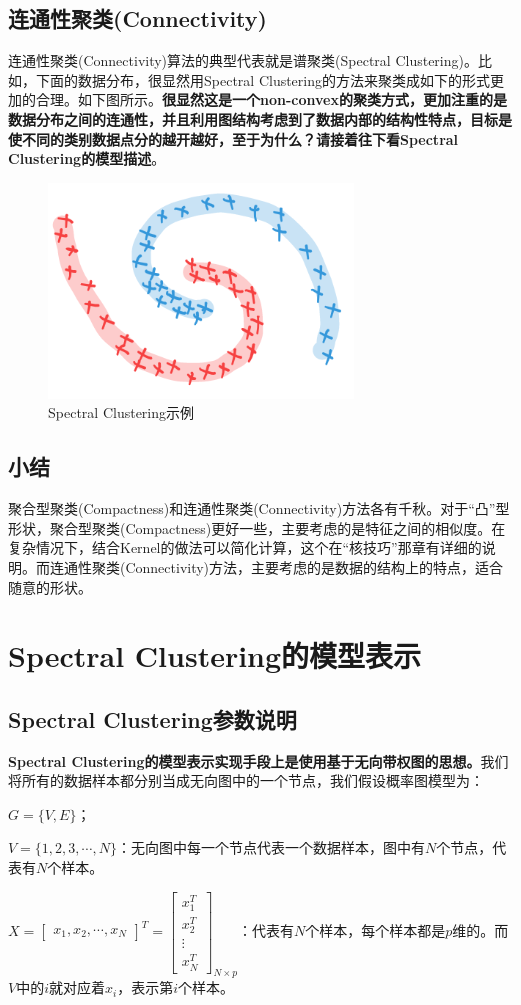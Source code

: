 \documentclass[a4paper]{article}
\begin{document}
\subsection{连通性聚类(Connectivity)}
连通性聚类(Connectivity)算法的典型代表就是谱聚类(Spectral Clustering)。比如，下面的数据分布，很显然用Spectral Clustering的方法来聚类成如下的形式更加的合理。如下图所示。\textbf{很显然这是一个non-convex的聚类方式，更加注重的是数据分布之间的连通性，并且利用图结构考虑到了数据内部的结构性特点，目标是使不同的类别数据点分的越开越好，至于为什么？请接着往下看Spectral Clustering的模型描述}。
\begin{figure}[H]
    \centering
    \includegraphics[width=.25\textwidth]{微信图片_20200302231505.png}
    \caption{Spectral Clustering示例}
    \label{fig:my_label_1}
\end{figure}
\subsection{小结}
聚合型聚类(Compactness)和连通性聚类(Connectivity)方法各有千秋。对于“凸”型形状，聚合型聚类(Compactness)更好一些，主要考虑的是特征之间的相似度。在复杂情况下，结合Kernel的做法可以简化计算，这个在“核技巧”那章有详细的说明。而连通性聚类(Connectivity)方法，主要考虑的是数据的结构上的特点，适合随意的形状。


\section{Spectral Clustering的模型表示}
\subsection{Spectral Clustering参数说明}
\textbf{Spectral Clustering的模型表示实现手段上是使用基于无向带权图的思想。}我们将所有的数据样本都分别当成无向图中的一个节点，我们假设概率图模型为：

$G=\{V,E\}$；

$V=\{1,2,3,\cdots,N\}$：无向图中每一个节点代表一个数据样本，图中有$N$个节点，代表有$N$个样本。

$X=\begin{bmatrix}x_1,x_2,\cdots,x_N\end{bmatrix}^T = \begin{bmatrix}x_1^T \\ x_2^T \\ \vdots \\ x_N^T\end{bmatrix}_{N\times p} $：代表有$N$个样本，每个样本都是$p$维的。而$V$中的$i$就对应着$x_i$，表示第$i$个样本。
\end{document}
